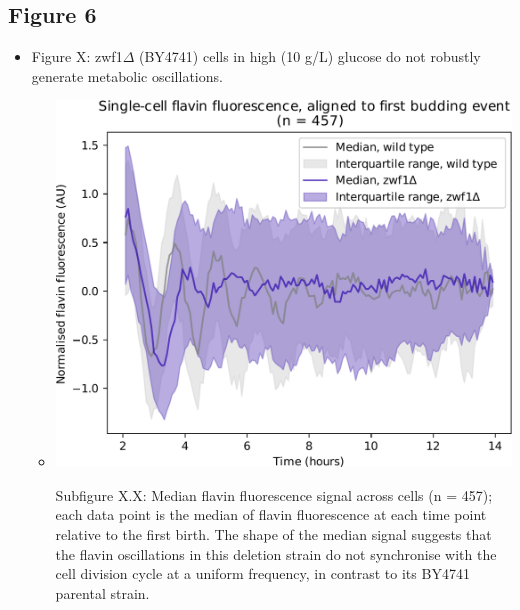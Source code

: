 \subsection{Figure 6}
\label{sec:org35a4444}
\begin{itemize}
\item Figure X: zwf1\(\Delta\) (BY4741) cells in high (10 g/L) glucose do not robustly generate metabolic oscillations.

\begin{itemize}
\item \begin{center}
\includegraphics[width=.9\linewidth]{zwf1_align_edit.pdf}
\end{center} Subfigure X.X: Median flavin fluorescence signal across cells (n = 457); each data point is the median of flavin fluorescence at each time point relative to the first birth.  The shape of the median signal suggests that the flavin oscillations in this deletion strain do not synchronise with the cell division cycle at a uniform frequency, in contrast to its BY4741 parental strain.
\end{itemize}


\end{itemize}
